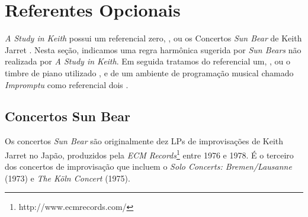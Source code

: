 




\section{Referentes Opcionais}\label{sec:sunbear}

\emph{A Study in Keith} possui um referencial zero, , ou os Concertos \emph{Sun Bear}  de Keith Jarret . Nesta seção, indicamos uma regra harmônica sugerida por \emph{Sun Bears} não realizada por \emph{A Study in Keith}. Em seguida tratamos do referencial um, , ou o timbre de piano utilizado , e de um ambiente de programação musical chamado \emph{Impromptu}  como referencial dois . 

\subsection{Concertos Sun Bear}\label{sec:sunbearanal}

Os concertos \emph{Sun Bear} são originalmente dez LPs  de improvisações de Keith Jarret no Japão, produzidos pela \emph{ECM Records}\footnote{http://www.ecmrecords.com/} entre 1976 e 1978. É o terceiro dos concertos de improvisação que incluem o \emph{Solo Concerts: Bremen/Lausanne} (1973) e \emph{The Köln Concert} (1975).

